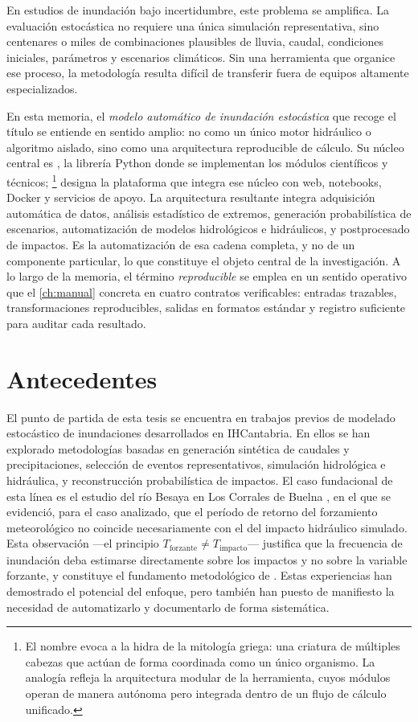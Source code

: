 En estudios de inundación bajo incertidumbre, este problema se amplifica. La evaluación estocástica no requiere una única simulación representativa, sino centenares o miles de combinaciones plausibles de lluvia, caudal, condiciones iniciales, parámetros y escenarios climáticos. Sin una herramienta que organice ese proceso, la metodología resulta difícil de transferir fuera de equipos altamente especializados.

En esta memoria, el \textit{modelo automático de inundación estocástica} que recoge el título se entiende en sentido amplio: no como un único motor hidráulico o algoritmo aislado, sino como una arquitectura reproducible de cálculo. Su núcleo central es \pyhydra, la librería Python donde se implementan los módulos científicos y técnicos; \hydra\footnote{El nombre evoca a la hidra de la mitología griega: una criatura de múltiples cabezas que actúan de forma coordinada como un único organismo. La analogía refleja la arquitectura modular de la herramienta, cuyos módulos operan de manera autónoma pero integrada dentro de un flujo de cálculo unificado.} designa la plataforma que integra ese núcleo con web, notebooks, Docker y servicios de apoyo. La arquitectura resultante integra adquisición automática de datos, análisis estadístico de extremos, generación probabilística de escenarios, automatización de modelos hidrológicos e hidráulicos, y postprocesado de impactos. Es la automatización de esa cadena completa, y no de un componente particular, lo que constituye el objeto central de la investigación. A lo largo de la memoria, el término \emph{reproducible} se emplea en un sentido operativo que el \cref{ch:manual} concreta en cuatro contratos verificables: entradas trazables, transformaciones reproducibles, salidas en formatos estándar y registro suficiente para auditar cada resultado.

\section{Antecedentes}

El punto de partida de esta tesis se encuentra en trabajos previos de modelado estocástico de inundaciones desarrollados en IHCantabria. En ellos se han explorado metodologías basadas en generación sintética de caudales y precipitaciones, selección de eventos representativos, simulación hidrológica e hidráulica, y reconstrucción probabilística de impactos. El caso fundacional de esta línea es el estudio del río Besaya en Los Corrales de Buelna \parencite{navas2018besaya}, en el que se evidenció, para el caso analizado, que el período de retorno del forzamiento meteorológico no coincide necesariamente con el del impacto hidráulico simulado. Esta observación ---el principio $T_{\mathrm{forzante}} \neq T_{\mathrm{impacto}}$--- justifica que la frecuencia de inundación deba estimarse directamente sobre los impactos y no sobre la variable forzante, y constituye el fundamento metodológico de \hydra. Estas experiencias han demostrado el potencial del enfoque, pero también han puesto de manifiesto la necesidad de automatizarlo y documentarlo de forma sistemática.

